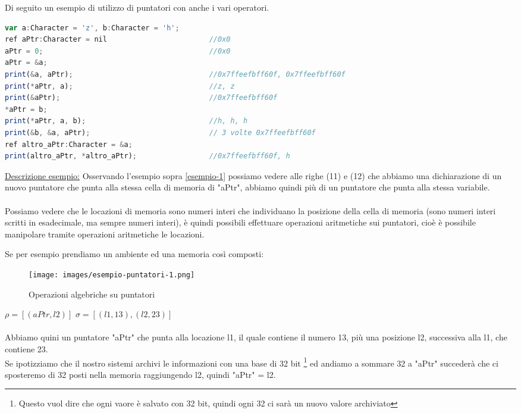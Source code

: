 \begin{example}\label{esempio-1}
Di seguito un esempio di utilizzo di puntatori con anche i vari operatori.
\end{example}
\vspace{2pt}
\begin{lstlisting}[language=Javascript, caption=Esempio puntatori e operatori sui puntatori]
var a:Character = 'z', b:Character = 'h';
ref aPtr:Character = nil                        //0x0
aPtr = 0;                                       //0x0
aPtr = &a;                                      
print(&a, aPtr);                                //0x7ffeefbff60f, 0x7ffeefbff60f
print(*aPtr, a);                                //z, z
print(&aPtr);                                   //0x7ffeefbff60f
*aPtr = b;
print(*aPtr, a, b);                             //h, h, h
print(&b, &a, aPtr);                            // 3 volte 0x7ffeefbff60f
ref altro_aPtr:Character = &a;                  
print(altro_aPtr, *altro_aPtr);                 //0x7ffeefbff60f, h
\end{lstlisting}
\vspace{3pt}

\hspace{-15pt}\underline{Descrizione esempio:} Osservando l'esempio sopra \ref{esempio-1} possiamo vedere alle righe (11) e (12) che abbiamo una dichiarazione di un nuovo puntatore che punta alla stessa cella di memoria di "aPtr", abbiamo quindi più di un puntatore che punta alla stessa variabile.\\\\
Possiamo vedere che le locazioni di memoria sono numeri interi che individuano la posizione della cella di memoria (sono numeri interi scritti in esadecimale, ma sempre numeri interi), è quindi possibili effettuare operazioni aritmetiche sui puntatori, cioè è possibile manipolare tramite operazioni aritmetiche le locazioni.\\
\begin{example}
Se per esempio prendiamo un ambiente ed una memoria così composti:
\end{example}
\begin{wrapfigure}[10]{r}{8cm}
    \vspace{-5pt}
    \centering
    \texttt{[image: images/esempio-puntatori-1.png]}
    \caption{Operazioni algebriche su puntatori}
\end{wrapfigure}

$\rho = [(aPtr, l2)]$ \: \: $\sigma = [(l1,13), (l2,23)]$\\ \\
Abbiamo quini un puntatore "aPtr" che punta alla locazione l1, il quale contiene il numero 13, più una posizione l2, successiva alla l1, che contiene 23.\\ Se ipotizziamo che il nostro sistemi archivi le informazioni con una base di 32 bit \footnote{Questo vuol dire che ogni vaore è salvato con 32 bit, quindi ogni 32 ci sarà un nuovo valore archiviato} ed andiamo a sommare 32 a "aPtr" succederà che ci sposteremo di 32 posti nella memoria raggiungendo l2, quindi "aPtr" = l2.

